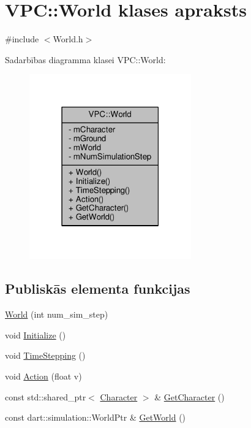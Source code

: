\hypertarget{class_v_p_c_1_1_world}{}\section{V\+PC\+:\+:World klases apraksts}
\label{class_v_p_c_1_1_world}


{\ttfamily \#include $<$World.\+h$>$}



Sadarbības diagramma klasei V\+PC\+:\+:World\+:
\nopagebreak
\begin{figure}[H]
\begin{center}
\leavevmode
\includegraphics[width=198pt]{class_v_p_c_1_1_world__coll__graph}
\end{center}
\end{figure}
\subsection*{Publiskās elementa funkcijas}
\begin{DoxyCompactItemize}
\item 
\hyperlink{class_v_p_c_1_1_world_ad254de0695a997e40e656f713457fd02}{World} (int num\+\_\+sim\+\_\+step)
\item 
void \hyperlink{class_v_p_c_1_1_world_ab539deccddaf2d046421fb1597c9f75f}{Initialize} ()
\item 
void \hyperlink{class_v_p_c_1_1_world_ab919f1a2120d4ba69baf6b71310ba44c}{Time\+Stepping} ()
\item 
void \hyperlink{class_v_p_c_1_1_world_a7c97e099140777b966a10a09a8ef8c46}{Action} (float v)
\item 
const std\+::shared\+\_\+ptr$<$ \hyperlink{class_v_p_c_1_1_character}{Character} $>$ \& \hyperlink{class_v_p_c_1_1_world_ac1036f6ad680a9fc111a2ab9fd7f8db7}{Get\+Character} ()
\item 
const dart\+::simulation\+::\+World\+Ptr \& \hyperlink{class_v_p_c_1_1_world_aa05d0cebdc8e0145b5adce7cd177e79b}{Get\+World} ()
\end{DoxyCompactItemize}
